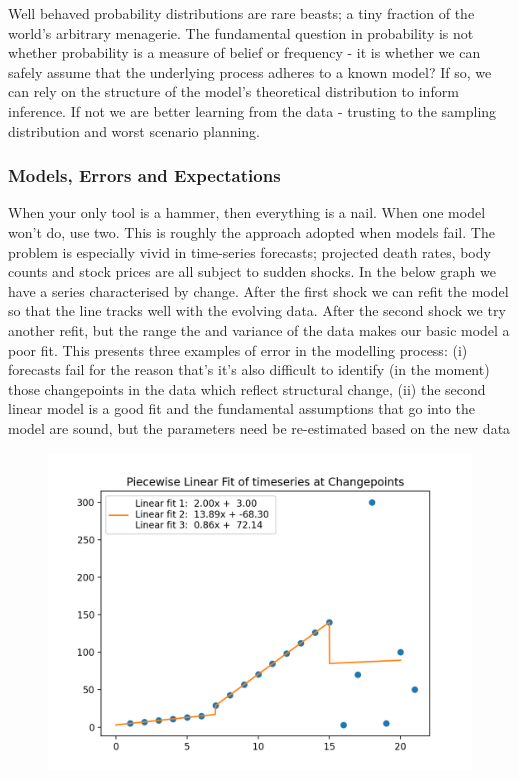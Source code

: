 \documentclass[10pt,a4paper,notitlepage, twocolumn]{article}
\begin{document}
Well behaved probability distributions are rare beasts; a tiny fraction of the world's arbitrary menagerie. The fundamental question in probability is not whether probability is a measure of belief or frequency - it is whether we can safely assume that the underlying process adheres to a known model? If so, we can rely on the structure of the model's theoretical distribution to inform inference. If not we are better learning from the data - trusting to the sampling distribution and worst scenario planning.

\subsubsection*{Models, Errors and Expectations}
When your only tool is a hammer, then everything is a nail. When one model won't do, use two. This is roughly the approach adopted when models fail. The problem is especially vivid in time-series forecasts; projected death rates, body counts and stock prices are all subject to sudden shocks. In the below graph we have a series characterised by change. After the first shock we can refit the model so that the line tracks well with the evolving data. After the second shock we try another refit, but the range the and variance of the data makes our basic model a poor fit. This presents three examples of error in the modelling process: (i) forecasts fail for the reason that's it's also difficult to identify (in the moment) those changepoints in the data which reflect structural change, (ii) the second linear model is a good fit and the fundamental assumptions that go into the model are sound, but the parameters need be re-estimated based on the new data
\begin{figure}[H]
  \includegraphics[width=\linewidth]{./Plots/piecewise_linear_fits.png}
\end{figure}
\end{document}
